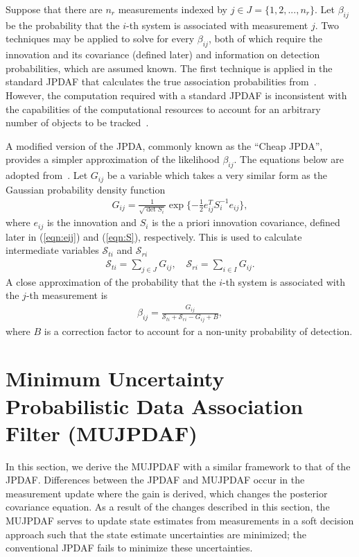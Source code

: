 \documentclass[letterpaper, paper,10pt]{AAS}		%
\newcommand{\refeqn}[1]{(\ref{eqn:#1})}
\begin{document}
Suppose that there are $n_r$ measurements indexed by $j\in J=\{1,2,...,n_r\}$.
Let $\beta_{ij}$ be the probability that the $i$-th system is associated with measurement $j$.
Two techniques may be applied to solve for every $\beta_{ij}$, both of which require the innovation and its covariance (defined later) and information on detection probabilities, which are assumed known.
The first technique is applied in the standard JPDAF that calculates the true association probabilities from~\cite[Eq. 9.(45-46)]{TrackDataAssoc}.
However, the computation required with a standard JPDAF is inconsistent with the capabilities of the computational resources to account for an arbitrary number of objects to be tracked~\cite{Bar1990}.

A modified version of the JPDA, commonly known as the ``Cheap JPDA'', provides a simpler approximation of the likelihood $\beta_{ij}$.
The equations below are adopted from~\cite[Eq. 1.(1-2)]{Bar1990}.
Let $G_{ij}$ be a variable which takes a very similar form as the Gaussian probability density function
\begin{align}
G_{ij}=\frac1{\sqrt{\det{S_{i}}}}\exp{\{-\frac12e_{ij}^TS_{i}^{-1}e_{ij}\}},
\end{align}
where $e_{ij}$ is the innovation and $S_{i}$ is the a priori innovation covariance, defined later in \refeqn{eij} and \refeqn{S}, respectively.
This is used to calculate intermediate variables $\mathcal{S}_{ti}$ and $\mathcal{S}_{ri}$
\begin{align}
\mathcal{S}_{ti}=\sum\limits_{j\in J}G_{ij}, 
\quad 
\mathcal{S}_{ri}=\sum\limits_{i\in I}G_{ij}.
\end{align}
A close approximation of the probability that the $i$-th system is associated with the $j$-th measurement is
\begin{align}
\beta_{ij}=\frac{G_{ij}}{\mathcal{S}_{ti}+\mathcal{S}_{ri}-G_{ij}+B}, 
\end{align}
where $B$ is a correction factor to account for a non-unity probability of detection.

\section{Minimum Uncertainty Probabilistic Data Association Filter (MUJPDAF)}
\label{MUJPDAF}

In this section, we derive the MUJPDAF with a similar framework to that of the JPDAF.
Differences between the JPDAF and MUJPDAF occur in the measurement update where the gain is derived, which changes the posterior covariance equation.
As a result of the changes described in this section, the MUJPDAF serves to update state estimates from measurements in a soft decision approach such that the state estimate uncertainties are minimized; the conventional JPDAF
fails
to minimize these uncertainties.
\end{document}
